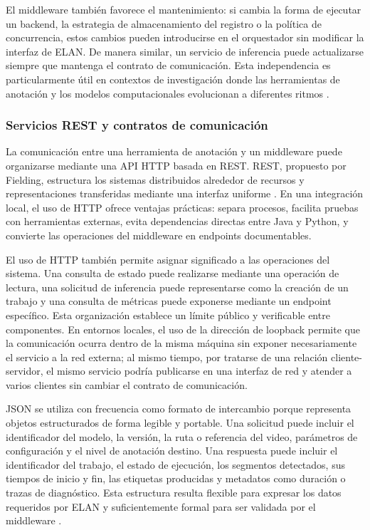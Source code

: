 El middleware también favorece el mantenimiento: si cambia la forma de ejecutar un backend, la estrategia de almacenamiento del registro o la política de concurrencia, estos cambios pueden introducirse en el orquestador sin modificar la interfaz de ELAN. De manera similar, un servicio de inferencia puede actualizarse siempre que mantenga el contrato de comunicación. Esta independencia es particularmente útil en contextos de investigación donde las herramientas de anotación y los modelos computacionales evolucionan a diferentes ritmos \cite{iso25010}.

\subsubsection{Servicios REST y contratos de comunicación}

La comunicación entre una herramienta de anotación y un middleware puede organizarse mediante una API HTTP basada en REST. REST, propuesto por Fielding, estructura los sistemas distribuidos alrededor de recursos y representaciones transferidas mediante una interfaz uniforme \cite{fielding2000rest}. En una integración local, el uso de HTTP ofrece ventajas prácticas: separa procesos, facilita pruebas con herramientas externas, evita dependencias directas entre Java y Python, y convierte las operaciones del middleware en endpoints documentables.

El uso de HTTP también permite asignar significado a las operaciones del sistema. Una consulta de estado puede realizarse mediante una operación de lectura, una solicitud de inferencia puede representarse como la creación de un trabajo y una consulta de métricas puede exponerse mediante un endpoint específico. Esta organización establece un límite público y verificable entre componentes. En entornos locales, el uso de la dirección de loopback permite que la comunicación ocurra dentro de la misma máquina sin exponer necesariamente el servicio a la red externa; al mismo tiempo, por tratarse de una relación cliente-servidor, el mismo servicio podría publicarse en una interfaz de red y atender a varios clientes sin cambiar el contrato de comunicación.

JSON se utiliza con frecuencia como formato de intercambio porque representa objetos estructurados de forma legible y portable. Una solicitud puede incluir el identificador del modelo, la versión, la ruta o referencia del video, parámetros de configuración y el nivel de anotación destino. Una respuesta puede incluir el identificador del trabajo, el estado de ejecución, los segmentos detectados, sus tiempos de inicio y fin, las etiquetas producidas y metadatos como duración o trazas de diagnóstico. Esta estructura resulta flexible para expresar los datos requeridos por ELAN y suficientemente formal para ser validada por el middleware \cite{pydantic2026models}.

